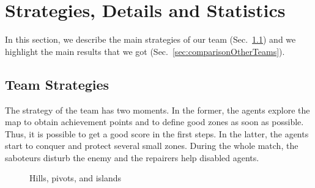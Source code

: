 \section{Strategies, Details and Statistics}
\label{secStrategies}

In this section, we describe the main strategies of our team (Sec.~\ref{sec:teamStrategies}) and we highlight the main results that we got (Sec.~\ref{sec:comparisonOtherTeams}).

\subsection{Team Strategies}
\label{sec:teamStrategies}

The strategy of the team has two moments. In the former, the agents explore the map to obtain achievement points and to define good zones as soon as possible. Thus, it is possible to get a good score in the first steps. In the latter, the agents start to conquer and protect several small zones. During the whole match, the saboteurs disturb the enemy and the repairers help disabled agents.


\begin{figure}[th]
 \vspace{-5mm}
 \centering
 \vspace{-3mm}\caption{Hills, pivots, and islands}
 \label{fig:hillislandpivot}
 \vspace{-3mm}
\end{figure}

